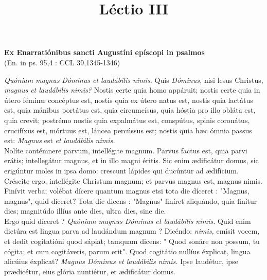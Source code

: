 \documentclass[options]{article}
\title{Léctio III}
\begin{document}
	\textbf{Ex Enarratiónibus sancti Augustíni epíscopi in psalmos}\\
	(En. in ps. 95,4 : CCL 39,1345-1346)
	
	\textit{Quóniam magnus Dóminus et laudábilis nimis.}
	Quis 
	\textit{Dóminus,}
	nisi lesus Christus, 
	\textit{magnus et laudábilis nimis?}
	Nostis certe quia homo appáruit; nostis certe quia in útero féminæ concéptus est, nostis quia ex útero natus est, nostis quia lactátus est, quia mánibus portátus est, quia circumcísus, quia hóstia pro illo obláta est, quia crevit; postrémo nostis quia expalmátus est, conspútus, spinis coronátus, crucifíxus est, mórtuus est, láncea percússus est; nostis quia hæc ómnia passus est: 
	\textit{Magnus}
	est
	\textit{et laudábilis nimis.}\\
	
	Nolíte contémnere parvum, intellégite magnum. Parvus factus est, quia parvi erátis; intellegátur magnus, et in illo magni éritis. Sic enim ædificátur domus, sic erigúntur moles in ipsa domo: crescunt lápides qui ducúntur ad ædifícium. Créscite ergo, intellégite Christum magnum; et parvus magnus est, magnus nimis. Finívit verba; volébat dícere quantum magnus  etsi tota die díceret : "Magnus, magnus", quid díceret? Tota die dicens : "Magnus" finíret aliquándo, quia finítur dies; magnitúdo illíus ante dies, ultra dies, sine die.
	\\
	
	Ergo quid díceret ?
	\textit{Quóniam magnus Dóminus et laudábilis nimis.}
	Quid enim dictúra est lingua parva ad laudándum magnum ? Dicéndo: 
	\textit{nimis,}
	emísit vocem, et dedit cogitatióni quod sápiat; tamquam dicens: " Quod sonáre non possum, tu cógita; et cum cogitáveris, parum erit". Quod cogitátio nullíus éxplicat, lingua alicúius éxplicat? 
	\textit{Magnus Dóminus et laudábilis nimis.}
	Ipse laudétur, ipse prædicétur, eius glória nuntiétur, et ædificátur domus.
	
	
	
\end{document}
